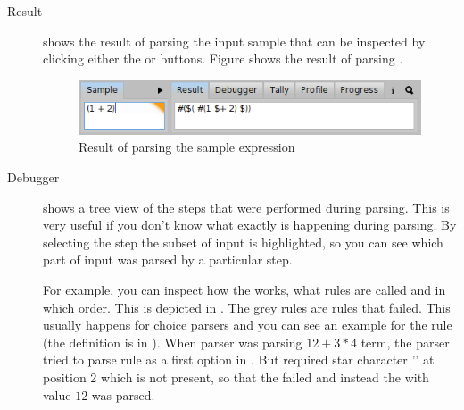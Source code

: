 \documentclass[a4paper,10pt,twoside]{book}
\begin{document}
\begin{description}

\item[Result] shows the result of parsing the input sample  that can be inspected by
  clicking either the  or  buttons. Figure
   shows the result of parsing .

  \begin{figure}[ht]
    \begin{center}
      \includegraphics[width=.7\linewidth]{PPBrowserResult}
      \caption{Result of parsing the  sample expression \label{fig:pp/browserResult}}
    \end{center}
  \end{figure}

\item[Debugger] shows a tree view of the steps that were performed
  during parsing. This is very useful if you don't know what exactly
  is happening during parsing. By selecting the step the subset of
  input is highlighted, so you can see which part of input was parsed
  by a particular step. 

  For example, you can inspect how the  works, 
    what rules are called and in which order.
  This is depicted in . 
  The grey rules are rules that failed. 
  This usually happens for choice parsers and you can see an example for the  rule 
    (the definition is in ). 
  When parser was parsing $12 + 3 * 4$ term, the parser tried to parse  rule 
    as a first option in .
  But  required star character '\ct{*}' at position 2 which is not present, so that the 
     failed and instead the  with value $12$ was parsed.




\end{description}
\end{document}
